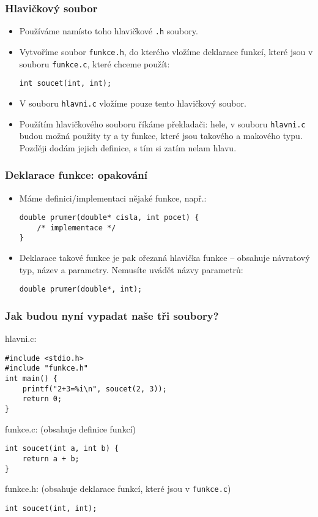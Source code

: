 \documentclass{beamer}
\newenvironment{itemizex}%
  {\large \begin{itemize}%
    \setlength{\itemsep}{8pt}%
    \setlength{\parskip}{8pt}}%
  {\end{itemize}}
\newenvironment{itemizey}%
  {\large \begin{itemize}%
    \setlength{\itemsep}{6pt}%
    \setlength{\parskip}{6pt}}%
  {\end{itemize}}
\begin{document}
\begin{frame}[t,fragile]\frametitle{Hlavičkový soubor} 
\begin{itemizey}
    \item Používáme namísto toho hlavičkové \texttt{.h} soubory. 
    \item Vytvoříme soubor \texttt{funkce.h}, do kterého vložíme deklarace funkcí, které jsou v souboru \texttt{funkce.c}, které chceme použít:

\begin{verbatim} 
int soucet(int, int);
\end{verbatim}
    \item V souboru \texttt{hlavni.c} vložíme pouze tento hlavičkový soubor. 
    \item Použítím hlavičkového souboru říkáme překladači: hele, v souboru \texttt{hlavni.c} budou možná použity ty a ty funkce, které jsou takového a makového typu. Později dodám jejich definice, s tím si zatím nelam hlavu. 
\end{itemizey}
\end{frame}


\begin{frame}[t,fragile]\frametitle{Deklarace funkce: opakování} 
    \begin{itemizex}
        \item Máme definici/implementaci nějaké funkce, např.:
\begin{verbatim} 
double prumer(double* cisla, int pocet) { 
    /* implementace */ 
}
\end{verbatim}
        \item Deklarace takové funkce je pak ořezaná hlavička funkce -- obsahuje návratový typ, název a parametry. Nemusíte uvádět názvy parametrů:
\begin{verbatim} 
double prumer(double*, int);
\end{verbatim}
    \end{itemizex}
\end{frame}


\begin{frame}[t,fragile]\frametitle{Jak budou nyní vypadat naše tři soubory?} 
hlavni.c:
\begin{verbatim} 
#include <stdio.h>
#include "funkce.h"
int main() {
    printf("2+3=%i\n", soucet(2, 3));
    return 0;
}
\end{verbatim}
funkce.c: (obsahuje definice funkcí)
\begin{verbatim} 
int soucet(int a, int b) {
    return a + b;
}
\end{verbatim}
funkce.h: (obsahuje deklarace funkcí, které jsou v \texttt{funkce.c})
\begin{verbatim} 
int soucet(int, int);
\end{verbatim}
\end{frame}
\end{document}
